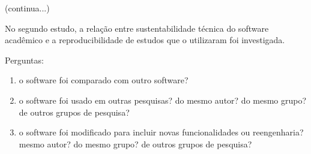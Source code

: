
(continua...)

No segundo estudo, a relação entre sustentabilidade técnica do software acadêmico e a reproducibilidade de estudos que o utilizaram foi investigada. 


Perguntas:
\begin{enumerate}
\item o software foi comparado com outro software?
\item o software foi usado em outras pesquisas? do mesmo autor? do mesmo grupo? de outros grupos de pesquisa?
\item o software foi modificado para incluir novas funcionalidades ou reengenharia?  mesmo autor? do mesmo grupo? de outros grupos de pesquisa?

\end{enumerate}


